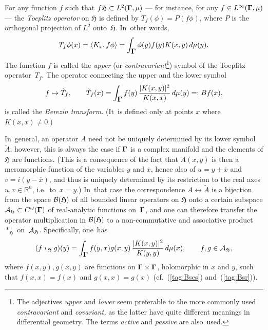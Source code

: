 \documentclass[11pt]{amsart}
\numberwithin{equation}{section}
\theoremstyle{remark}
\newcommand\spr[2]{\langle #1,#2\rangle}
\newcommand\into{\int_\Omg}
\newcommand\AAA{{\Cal A}}
\newcommand\Omg{{\bigam}}   %
\newcommand\HH{\mathfrak H}
\newcommand\RR{\mathbb R}
\newcommand{\bigam}{\mbox{\boldmath $\Gamma$}}
\begin{document}
For any function $f$ such that $f\HH\subset L^2(\Omg,\mu)$ --- for instance,
for any $f\in L^\infty(\Omg,\mu)$ --- the {\sl Toeplitz operator\/} on $\HH$ is
defined by $T_f(\phi) = P(f\phi)$, where $P$ is the orthogonal projection of
$L^2$ onto~$\HH$. In~other words,
\begin{equation}  T_f \phi(x) = \spr{K_x}{f\phi} = \into \phi(y) f(y) K(x,y)
\,d\mu(y). \label{tag:Bt}  \end{equation}
The function $f$ is called the {\sl upper\/} (or {\sl contravariant\/}\footnote
{The adjectives {\it upper\/} and {\it lower\/} seem preferable to the more
commonly used {\it contravariant\/} and {\it covariant,\/} as the latter have
quite different meanings in differential geometry. The terms {\sl active\/} and
{\sl passive\/} are also~used.}) symbol of the Toeplitz operator~$T_f$.
The operator connecting the upper and the lower symbol
\begin{equation}  f\mapsto \tilde T_f, \qquad \tilde T_f(x) = \into f(y) \,
\frac{|K(x,y)|^2} {K(x,x)} \,d\mu(y) =: Bf(x) ,  \label{tag:Bo}  \end{equation}
is called the {\sl Berezin transform.\/} (It~is defined only at points $x$
where $K(x,x)\neq0$.)

In~general, an operator $A$ need not be uniquely determined by its lower
symbol~$\tilde A$; however, this is always the case if $\Omg$ is a complex
manifold and the elements of $\HH$ are  functions. (This
is a consequence of the fact that $A(x,y)$ is then a meromorphic function of
the variables $y$ and $\overline x$, hence also of $u=y+\overline x$ and
$v=i(y-\overline x)$, and thus is uniquely determined by its restriction to the
real axes $u,v\in\RR^n$, i.e.~to~$x=y$.) In~that case the correspondence
$A\leftrightarrow\tilde A$ is a bijection from the space $\Cal B(\HH)$ of all
bounded linear operators on $\HH$ onto a certain subspace $\AAA_\HH\subset
C^\omega(\Omg)$ of real-analytic functions on~$\Omg$, and one can therefore
transfer the operator multiplication in $\Cal B(\HH)$ to a non-commutative and
associative product $*_\HH$ on~$\AAA_\HH$. Specifically, one~has
\begin{equation}  (f *_\HH g)(y) = \into f(y,x)g(x,y) \,
\frac{|K(x,y)|^2}{K(y,y)} \, d\mu(x), \qquad f,g\in\AAA_\HH,  \label{tag:Bpro}
\end{equation}
where $f(x,y),g(x,y)$ are functions on $\Omg\times\Omg$, holomorphic in $x$
and $\overline y$, such that $f(x,x)=f(x)$ and $g(x,x)=g(x)$
(cf.~(\ref{tag:Bses}) and~(\ref{tag:Bsr})).
\end{document}
